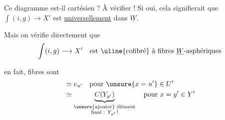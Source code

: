 Ce diagramme est-il cartésien ? À vérifier ! Si oui, cela signifierait que $\int(i,g)\longrightarrow X'$ est \uline{universellement} dans $\underline W$.

\margin{$\Vert\,|$}
Mais on vérifie directement que
\[
\int(i,g)\longrightarrow X'\quad\text{est \uline{cofibré} à fibres $\underline W$-asphériques}
\]

en fait, fibres sont
\[
\begin{aligned}
&\simeq e_{u'}\quad\text{pour }\unsure{x=u'}\in U'\\
&\simeq\underbrace{C(Y_{y'})}_{\substack{\text{\unsure{ajouter} élément}\\\text{final : }Y_{y'}\,!}}\quad\text{pour }x=y'\in Y'
\end{aligned}
\]
